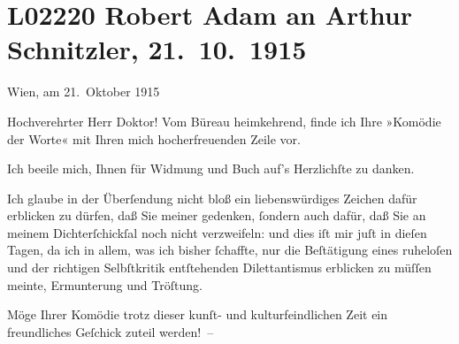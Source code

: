 

\section[Robert Adam an Arthur Schnitzler, 21. 10. 1915]{L02220 Robert Adam an Arthur Schnitzler, 21. 10. 1915}
\nopagebreak{}
\rehead{ }\normalsize\beginnumbering{}
\toendnotes[C]{\smallbreak\pagebreak[2]}
\toendnotes[C]{\smallbreak}
\pstart
           \raggedleft{}{\pb}Wien, am 21. Oktober 1915\pend
           
\pstart{}Hochverehrter Herr Doktor!\pend\vspace{0.5em}
\pstart
           Vom Büreau heimkehrend, finde ich Ihre »Komödie der
                  Worte« mit Ihren mich hocherfreuenden Zeile vor.\pend
           
\pstart
           Ich beeile mich, Ihnen für Widmung und Buch auf’s Herzlichſte zu danken.\pend
           
\pstart
           Ich glaube in der Überſendung nicht bloß ein liebenswürdiges Zeichen dafür erblicken
               zu dürfen, daß Sie meiner gedenken, ſondern auch dafür, daß Sie an meinem
               Dichterſchickſal noch nicht verzweifeln: und dies iſt mir juſt in dieſen Tagen, da
               ich in allem, was ich bisher ſchaffte, nur die Beſtätigung eines ruheloſen und der
               richtigen Selbſtkritik {\pb}entſtehenden Dilettantismus
               erblicken zu müſſen meinte, Ermunterung und Tröſtung.\pend
           
\pstart
           Möge Ihrer Komödie trotz
               dieser kunſt- und kulturfeindlichen Zeit ein freundliches Geſchick zuteil
               werden! –\pend
           
